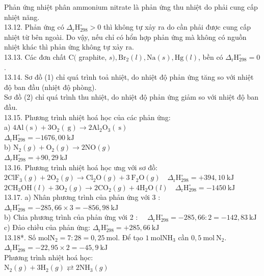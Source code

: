 \documentclass[10pt]{article}
\begin{document}
Phản ứng nhiệt phân ammonium nitrate là phản ứng thu nhiệt do phải cung cấp nhiệt năng.\\
13.12. Phản ứng có $\Delta_{\mathrm{r}} \mathrm{H}_{298}^{\circ}>0$ thì không tự xảy ra do cần phải được cung cấp nhiệt từ bên ngoài. Do vậy, nếu chỉ có hổn hợp phản ứng mà không có nguồn nhiệt khác thì phản ứng không tự xảy ra.\\
13.13. Các đơn chất $\mathrm{C}($ graphite, $s), \mathrm{Br}_{2}(l), \mathrm{Na}(s), \mathrm{Hg}(l)$, bền có $\Delta_{\mathrm{r}} \mathrm{H}_{298}^{\circ}=0$.\\
13.14. Sơ đồ (1) chỉ quá trình toả nhiệt, do nhiệt độ phản ứng tăng so với nhiệt độ ban đầu (nhiệt độ phòng).\\
Sơ đồ (2) chỉ quá trình thu nhiệt, do nhiệt độ phản ứng giảm so với nhiệt độ ban đầu.\\
13.15. Phương trình nhiệt hoá học của các phản ứng:\\
a) $4 \mathrm{Al}(\mathrm{s})+3 \mathrm{O}_{2}(\mathrm{~g}) \rightarrow 2 \mathrm{Al}_{2} \mathrm{O}_{3}(\mathrm{~s})$\\
$\Delta_{\mathrm{r}} \mathrm{H}_{298}^{\circ}=-1676,00 \mathrm{~kJ}$\\
b) $\mathrm{N}_{2}(g)+\mathrm{O}_{2}(g) \rightarrow 2 \mathrm{NO}(g)$\\
$\Delta_{r} \mathrm{H}_{298}^{\circ}=+90,29 \mathrm{~kJ}$\\
13.16. Phương trình nhiệt hoá học ưng với sơ đồ:\\
$2 \mathrm{ClF}_{3}(g)+2 \mathrm{O}_{2}(g) \rightarrow \mathrm{Cl}_{2} \mathrm{O}(g)+3 \mathrm{~F}_{2} \mathrm{O}(g) \quad \Delta_{\mathrm{r}} \mathrm{H}_{298}^{\circ}=+394,10 \mathrm{~kJ}$\\
$2 \mathrm{CH}_{3} \mathrm{OH}(l)+3 \mathrm{O}_{2}(g) \rightarrow 2 \mathrm{CO}_{2}(g)+4 \mathrm{H}_{2} \mathrm{O}(l) \quad \Delta_{\mathrm{r}} \mathrm{H}_{298}^{\circ}=-1450 \mathrm{~kJ}$\\
13.17. a) Nhân phương trình của phản ứng với 3 : $\Delta_{\mathrm{r}} \mathrm{H}_{298}^{\circ}=-285,66 \times 3=-856,98 \mathrm{~kJ}$\\
b) Chia phương trình của phản ứng với 2 : $\quad \Delta_{\mathrm{r}} \mathrm{H}_{298}^{\circ}=-285,66: 2=-142,83 \mathrm{~kJ}$\\
c) Đảo chiều của phản ứng: $\Delta_{\mathrm{r}} \mathrm{H}_{298}^{\circ}=+285,66 \mathrm{~kJ}$\\
13.18*. Số $\mathrm{mol} \mathrm{N}_{2}=7: 28=0,25 \mathrm{~mol}$. Để tạo $1 \mathrm{~mol} \mathrm{NH}_{3}$ cần $0,5 \mathrm{~mol} \mathrm{~N}_{2}$.\\
$\Delta_{\mathrm{r}} \mathrm{H}_{298}^{\circ}=-22,95 \times 2=-45,9 \mathrm{~kJ}$\\
Phương trình nhiệt hoá học:\\
$\mathrm{N}_{2}(g)+3 \mathrm{H}_{2}(g) \rightleftarrows 2 \mathrm{NH}_{3}(g)$
\end{document}
